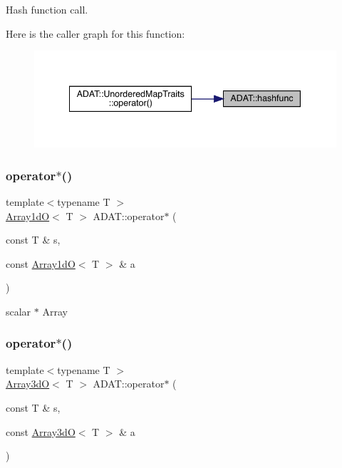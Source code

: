 Hash function call. 

Here is the caller graph for this function\+:\nopagebreak
\begin{figure}[H]
\begin{center}
\leavevmode
\includegraphics[width=341pt]{d5/d0d/namespaceADAT_ac0708a73475d6ed645b663e2d919f90b_icgraph}
\end{center}
\end{figure}
\mbox{\label{namespaceADAT_af3b34c2746ded9a7804cc7f35945a02e}} 
\subsubsection{\texorpdfstring{operator$\ast$()}{operator*()}\hspace{0.1cm}{\footnotesize\ttfamily [1/2]}}
{\footnotesize\ttfamily template$<$typename T $>$ \\
\mbox{\hyperlink{classADAT_1_1Array1dO}{Array1dO}}$<$ T $>$ A\+D\+A\+T\+::operator$\ast$ (\begin{DoxyParamCaption}\item[{const T \&}]{s,  }\item[{const \mbox{\hyperlink{classADAT_1_1Array1dO}{Array1dO}}$<$ T $>$ \&}]{a }\end{DoxyParamCaption})\hspace{0.3cm}{\ttfamily [inline]}}



scalar $\ast$ Array 

\mbox{\label{namespaceADAT_aef364bd88d427d6a56a11f3201cbfaca}} 
\subsubsection{\texorpdfstring{operator$\ast$()}{operator*()}\hspace{0.1cm}{\footnotesize\ttfamily [2/2]}}
{\footnotesize\ttfamily template$<$typename T $>$ \\
\mbox{\hyperlink{classADAT_1_1Array3dO}{Array3dO}}$<$ T $>$ A\+D\+A\+T\+::operator$\ast$ (\begin{DoxyParamCaption}\item[{const T \&}]{s,  }\item[{const \mbox{\hyperlink{classADAT_1_1Array3dO}{Array3dO}}$<$ T $>$ \&}]{a }\end{DoxyParamCaption})\hspace{0.3cm}{\ttfamily [inline]}}



